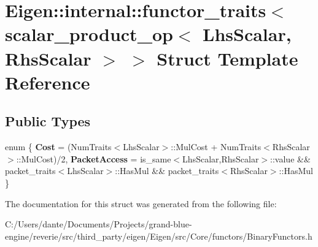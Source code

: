 \hypertarget{struct_eigen_1_1internal_1_1functor__traits_3_01scalar__product__op_3_01_lhs_scalar_00_01_rhs_scalar_01_4_01_4}{}\section{Eigen\+::internal\+::functor\+\_\+traits$<$ scalar\+\_\+product\+\_\+op$<$ Lhs\+Scalar, Rhs\+Scalar $>$ $>$ Struct Template Reference}
\label{struct_eigen_1_1internal_1_1functor__traits_3_01scalar__product__op_3_01_lhs_scalar_00_01_rhs_scalar_01_4_01_4}
\subsection*{Public Types}
\begin{DoxyCompactItemize}
\item 
\mbox{\label{struct_eigen_1_1internal_1_1functor__traits_3_01scalar__product__op_3_01_lhs_scalar_00_01_rhs_scalar_01_4_01_4_af3a1af42c294f4c5e27add4ff80e14ce}} 
enum \{ {\bfseries Cost} = (Num\+Traits$<$Lhs\+Scalar$>$\+::Mul\+Cost + Num\+Traits$<$Rhs\+Scalar$>$\+::Mul\+Cost)/2, 
{\bfseries Packet\+Access} = is\+\_\+same$<$Lhs\+Scalar,Rhs\+Scalar$>$\+::value \&\& packet\+\_\+traits$<$Lhs\+Scalar$>$\+::Has\+Mul \&\& packet\+\_\+traits$<$Rhs\+Scalar$>$\+::Has\+Mul
 \}
\end{DoxyCompactItemize}


The documentation for this struct was generated from the following file\+:\begin{DoxyCompactItemize}
\item 
C\+:/\+Users/dante/\+Documents/\+Projects/grand-\/blue-\/engine/reverie/src/third\+\_\+party/eigen/\+Eigen/src/\+Core/functors/Binary\+Functors.\+h\end{DoxyCompactItemize}
